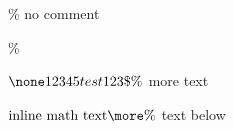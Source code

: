 


	\\%
	\\\% no comment
	
	\% \? \,  
	
	$\none12345 test 123\$\%$ more text
	
	$\text{inline math text}
	\more\% %
	$ text below

